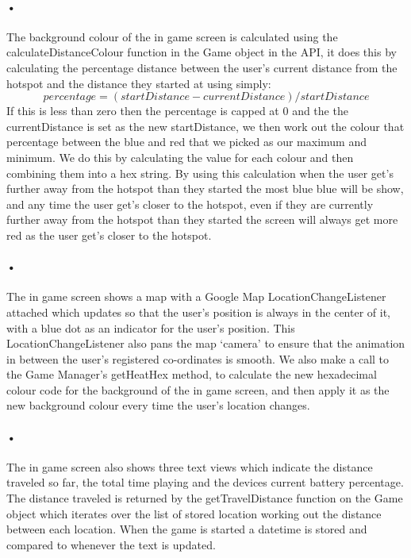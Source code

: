 \documentclass[10pt, a4paper]{article}
\begin{document}
\paragraph*{•}
The background colour of the in game screen is calculated using the calculateDistanceColour function in the Game object in the API, it does this by calculating the percentage distance between the user's current distance from the hotspot and the distance they started at using simply:
\[percentage = (startDistance - currentDistance)/startDistance\]
If this is less than zero then the percentage is capped at 0 and the the currentDistance is set as the new startDistance, we then work out the colour that percentage between the blue and red that we picked as our maximum and minimum. We do this by calculating the value for each colour and then combining them into a hex string.
By using this calculation when the user get's further away from the hotspot than they started the most blue blue will be show, and any time the user get's closer to the hotspot, even if they are currently further away from the hotspot than they started the screen will always get more red as the user get's closer to the hotspot.

\paragraph*{•}
The in game screen shows a map with a Google Map LocationChangeListener attached which updates so that the user's position is always in the center of it, with a blue dot as an indicator for the user's position. This LocationChangeListener also pans the map `camera' to ensure that the animation in between the user's registered co-ordinates is smooth. We also make a call to the Game Manager's getHeatHex method, to calculate the new hexadecimal colour code for the background of the in game screen, and then apply it as the new background colour every time the user's location changes.

\paragraph*{•}
The in game screen also shows three text views which indicate the distance traveled so far, the total time playing and the devices current battery percentage. The distance traveled is returned by the getTravelDistance function on the Game object which iterates over the list of stored location working out the distance between each location. When the game is started a datetime is stored and compared to whenever the text is updated.
\end{document}
